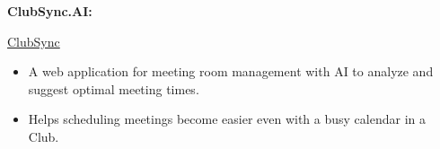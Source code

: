 \documentclass[11pt]{article}
\begin{document}
\vspace{3pt}

\noindent \textbf{ClubSync.AI:}

\href{https://github.com/HieuGM/-AIDEA-ClubSync_AI}{ClubSync}
\begin{itemize}[noitemsep, topsep=0pt, partopsep=0pt, parsep=0pt, leftmargin=*]

\item A web application for meeting room management with AI to analyze and suggest optimal meeting times.
\item Helps scheduling meetings become easier even with a busy calendar in a Club.
\end{itemize}
\end{document}
